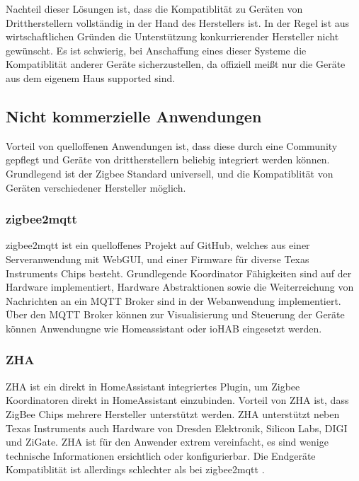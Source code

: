 Nachteil dieser Lösungen ist, dass die Kompatiblität zu Geräten von Drittherstellern vollständig in der Hand des Herstellers ist. In der Regel ist aus
wirtschaftlichen Gründen die Unterstützung konkurrierender Hersteller nicht gewünscht. Es ist schwierig, bei Anschaffung eines dieser Systeme die Kompatiblität
anderer Geräte sicherzustellen, da offiziell meißt nur die Geräte aus dem eigenem Haus supported sind.

\subsection{Nicht kommerzielle Anwendungen}

Vorteil von quelloffenen Anwendungen ist, dass diese durch eine Community gepflegt und Geräte von drittherstellern beliebig integriert werden können.
Grundlegend ist der Zigbee Standard universell, und die Kompatiblität von Geräten verschiedener Hersteller möglich.

\subsubsection{zigbee2mqtt}

\grqq zigbee2mqtt \grqq{} ist ein quelloffenes Projekt auf GitHub, welches aus einer Serveranwendung mit WebGUI, und einer Firmware für diverse Texas Instruments Chips besteht.
Grundlegende Koordinator Fähigkeiten sind auf der Hardware implementiert, Hardware Abstraktionen sowie die Weiterreichung von Nachrichten an ein MQTT Broker sind
in der Webanwendung implementiert. Über den  MQTT Broker können zur Visualisierung und Steuerung der Geräte können Anwendungne wie Homeassistant oder ioHAB eingesetzt
werden. 

\subsubsection{ZHA}
ZHA ist ein direkt in HomeAssistant integriertes Plugin, um Zigbee Koordinatoren direkt in HomeAssistant einzubinden. Vorteil
von ZHA ist, dass ZigBee Chips mehrere Hersteller unterstützt werden. ZHA unterstützt neben Texas Instruments auch Hardware von Dresden Elektronik,
Silicon Labs, DIGI und ZiGate. ZHA ist für den Anwender extrem vereinfacht, es sind wenige technische Informationen ersichtlich oder konfigurierbar.
Die Endgeräte Kompatiblität ist allerdings schlechter als bei \grqq zigbee2mqtt \grqq{}.







